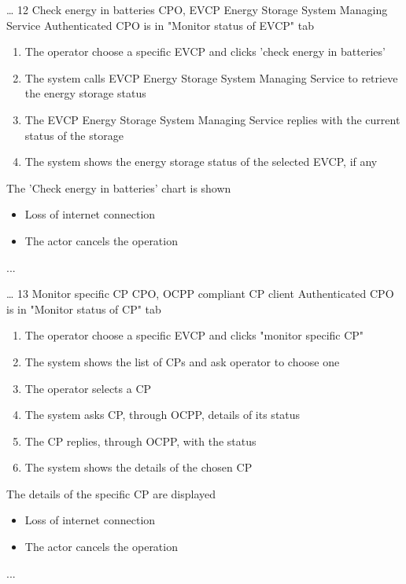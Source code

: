 \usecase
{
    \dots %
}
{12}
{Check energy in batteries} %
{CPO, EVCP Energy Storage System Managing Service} %
{Authenticated CPO is in "Monitor status of EVCP" tab} %
{ %
    \begin{enumerate}
        \item The operator choose a specific EVCP and clicks 'check energy in batteries'
        \item The system calls EVCP Energy Storage System Managing Service to retrieve the energy storage status
        \item The EVCP Energy Storage System Managing Service replies with the current status of the storage
        \item The system shows the energy storage status of the selected EVCP, if any
    \end{enumerate}
}
{The 'Check energy in batteries' chart is shown} %
{ %
    \begin{itemize}
        \item Loss of internet connection
        \item The actor cancels the operation
    \end{itemize}
}
{ %
    ...
}

\usecase
{
    \dots %
}
{13}
{Monitor specific CP} %
{CPO, OCPP compliant CP client} %
{Authenticated CPO is in "Monitor status of CP" tab} %
{ %
    \begin{enumerate}
        \item The operator choose a specific EVCP and clicks "monitor specific CP"
        \item The system shows the list of CPs and ask operator to choose one
        \item The operator selects a CP
        \item The system asks CP, through OCPP, details of its status
        \item The CP replies, through OCPP, with the status
        \item The system shows the details of the chosen CP
    \end{enumerate}
}
{The details of the specific CP are displayed} %
{ %
    \begin{itemize}
        \item Loss of internet connection
        \item The actor cancels the operation
    \end{itemize}
}
{ %
    ...
}

